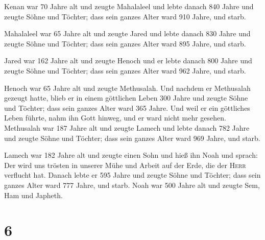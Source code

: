  Kenan war 70 Jahre alt und zeugte Mahalaleel
 und lebte danach 840 Jahre und zeugte Söhne und Töchter;
 dass sein ganzes Alter ward 910 Jahre, und starb.

 Mahalaleel war 65 Jahre alt und zeugte Jared
 und lebte danach 830 Jahre und zeugte Söhne und Töchter;
 dass sein ganzes Alter ward 895 Jahre, und starb.

 Jared war 162 Jahre alt und zeugte Henoch
 und er lebte danach 800 Jahre und zeugte Söhne und
Töchter;  dass sein ganzes Alter ward 962 Jahre, und
starb.

 Henoch war 65 Jahre alt und zeugte Methusalah.
 Und nachdem er Methusalah gezeugt hatte, blieb er in
einem göttlichen Leben 300 Jahre und zeugte Söhne und Töchter;
 dass sein ganzes Alter ward 365 Jahre. 
Und weil er ein göttliches Leben führte, nahm ihn Gott hinweg, und er
ward nicht mehr gesehen.  Methusalah war 187 Jahre alt
und zeugte Lamech  und lebte danach 782 Jahre und zeugte
Söhne und Töchter;  dass sein ganzes Alter ward 969
Jahre, und starb.

 Lamech war 182 Jahre alt und zeugte einen Sohn
 und hieß ihn Noah und sprach: Der wird uns trösten in
unserer Mühe und Arbeit auf der Erde, die der \textsc{Herr} verflucht
hat.  Danach lebte er 595 Jahre und zeugte Söhne und
Töchter;  dass sein ganzes Alter ward 777 Jahre, und
starb.  Noah war 500 Jahre alt und zeugte Sem, Ham und
Japheth.

\hypertarget{section-5}{%
\section{6}\label{section-5}}

